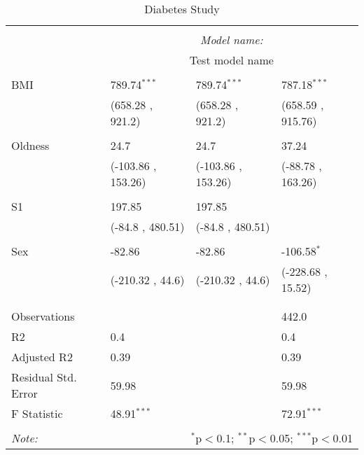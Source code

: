 \begin{table}[!htbp] \centering
  \caption{Diabetes Study}
  \label{}
\begin{tabularx}{\textwidth}{lXXX}
\\[-1.8ex]\hline
\hline \\[-1.8ex]
& \multicolumn{3}{c}{\textit{Model name:}} \
\cr \cline{3-4}
\\[-1.8ex] & \multicolumn{3}{c}{Test model name} \\\hline \\[-1.8ex]
 BMI & 789.74$^{***}$ & 789.74$^{***}$ & 787.18$^{***}$ \\
  & (658.28 , 921.2) & (658.28 , 921.2) & (658.59 , 915.76) \\
  & & & \\
 Oldness & 24.7$^{}$ & 24.7$^{}$ & 37.24$^{}$ \\
  & (-103.86 , 153.26) & (-103.86 , 153.26) & (-88.78 , 163.26) \\
  & & & \\
 S1 & 197.85$^{}$ & 197.85$^{}$ & \\
  & (-84.8 , 480.51) & (-84.8 , 480.51) & \\
  & & & \\
 Sex & -82.86$^{}$ & -82.86$^{}$ & -106.58$^{*}$ \\
  & (-210.32 , 44.6) & (-210.32 , 44.6) & (-228.68 , 15.52) \\
  & & & \\
\hline \\[-1.8ex]
 Observations &   &   & 442.0 \\
 R${2}$ & 0.4 &   & 0.4 \\
 Adjusted R${2}$ & 0.39 &   & 0.39 \\
 Residual Std. Error & 59.98 &   & 59.98  \\
 F Statistic & 48.91$^{***}$  &     & 72.91$^{***}$  \\
\hline
\hline \\[-1.8ex]
\textit{Note:} & \multicolumn{3}{r}{$^{*}$p$<$0.1; $^{**}$p$<$0.05; $^{***}$p$<$0.01} \\
\end{tabularx}
\end{table}